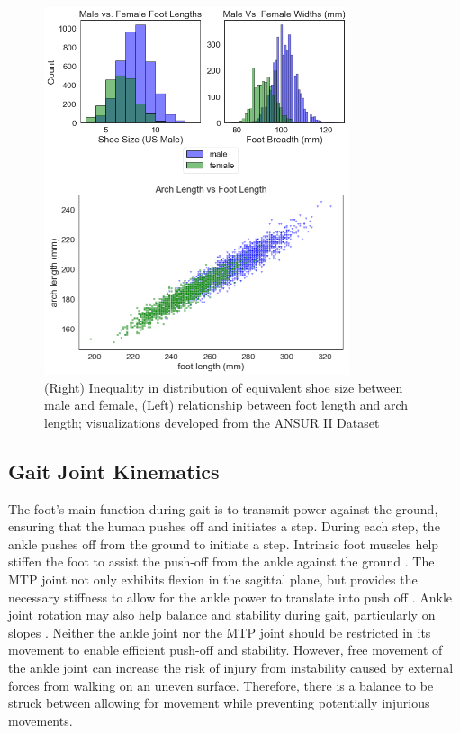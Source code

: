 \documentclass[defaultstyle,11pt]{comps}
\begin{document}
\begin{figure}
\hypertarget{fig:SA3-ANSUR}{%
\centering
\includegraphics[width=0.8\textwidth,height=\textheight]{../fig/SA3/ANSUR.png}
\caption{(Right) Inequality in distribution of equivalent shoe size between male and female, (Left) relationship between foot length and arch length; visualizations developed from the ANSUR II Dataset}\label{fig:SA3-ANSUR}
}
\end{figure}

\hypertarget{gait-joint-kinematics}{%
\subsection{Gait Joint Kinematics}\label{gait-joint-kinematics}}

The foot's main function during gait is to transmit power against the ground, ensuring that the human pushes off and initiates a step.
During each step, the ankle pushes off from the ground to initiate a step.
Intrinsic foot muscles help stiffen the foot to assist the push-off from the ankle against the ground \citep{Farris2019}.
The MTP joint not only exhibits flexion in the sagittal plane, but provides the necessary stiffness to allow for the ankle power to translate into push off \citep{Stefanyshyn1997}.
Ankle joint rotation may also help balance and stability during gait, particularly on slopes \citep{Wannop2014}. Neither the ankle joint nor the MTP joint should be restricted in its movement to enable efficient push-off and stability.
However, free movement of the ankle joint can increase the risk of injury from instability caused by external forces from walking on an uneven surface.
Therefore, there is a balance to be struck between allowing for movement while preventing potentially injurious movements.
\end{document}
